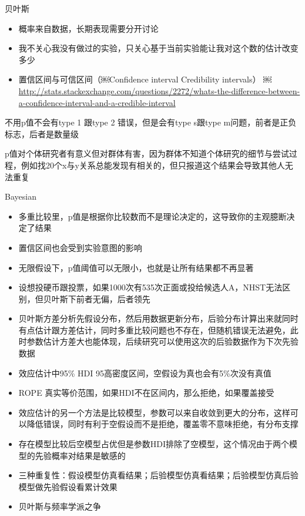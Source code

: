 \documentclass[]{book}
\providecommand{\tightlist}{%
  \setlength{\itemsep}{0pt}\setlength{\parskip}{0pt}}
\begin{document}
贝叶斯

\begin{itemize}
\tightlist
\item
  概率来自数据，长期表现需要分开讨论
\item
  我不关心我没有做过的实验，只关心基于当前实验能让我对这个数的估计改变多少
\item
  置信区间与可信区间（￼Confidence interval Credibility intervals） ￼
  \url{http://stats.stackexchange.com/questions/2272/whats-the-difference-between-a-confidence-interval-and-a-credible-interval}
\end{itemize}

不用p值不会有type 1 跟type 2 错误，但是会有type s跟type
m问题，前者是正负标志，后者是数量级

p值对个体研究者有意义但对群体有害，因为群体不知道个体研究的细节与尝试过程，例如找20个x与y关系总能发现有相关的，但只报道这个结果会导致其他人无法重复

Bayesian

\begin{itemize}
\item
  多重比较里，p值是根据你比较数而不是理论决定的，这导致你的主观臆断决定了结果
\item
  置信区间也会受到实验意图的影响
\item
  无限假设下，p值阈值可以无限小，也就是让所有结果都不再显著
\item
  设想投硬币跟投票，如果1000次有535次正面或投给候选人A，NHST无法区别，但贝叶斯下前者无偏，后者领先
\item
  贝叶斯方差分析先假设分布，然后用数据更新分布，后验分布计算出来就同时有点估计跟方差估计，同时多重比较问题也不存在，但随机错误无法避免，此时参数估计方差大也能体现，后续研究可以使用这次的后验数据作为下次先验数据
\item
  效应估计中95\% HDI 95高密度区间，空假设为真也会有5\%次没有真值
\item
  ROPE 真实等价范围，如果HDI不在区间内，那么拒绝，如果覆盖接受
\item
  效应估计的另一个方法是比较模型，参数可以来自收敛到更大的分布，这样可以降低错误，同时有利于空假设而不是拒绝，覆盖零不意味拒绝，有分布支撑
\item
  存在模型比较后空模型占优但是参数HDI排除了空模型，这个情况由于两个模型的先验概率对结果是敏感的
\item
  三种重复性：假设模型仿真看结果；后验模型仿真看结果；后验模型仿真后验模型做先验假设看累计效果
\item
  贝叶斯与频率学派之争
\end{itemize}
\end{document}

